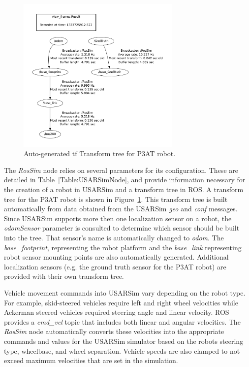 \begin{figure}[t!]
\centering
\includegraphics[width=8cm]{Figures/ROS/P3ATFrames.pdf}
\caption{Auto-generated tf Transform tree for P3AT robot.}
\label{Fig:P3ATTransformTree}
\end{figure}

The {\it RosSim} node relies on several parameters for its configuration. These are detailed in Table~\ref{Table:USARSimNode}, and provide information necessary for the creation of a robot in USARSim and a transform tree in ROS. A transform tree for the P3AT robot is shown in Figure~\ref{Fig:P3ATTransformTree}. This transform tree is built automatically from data obtained from the USARSim {\it geo} and {\it conf} messages. Since USARSim supports more then one localization sensor on a robot, the {\it odomSensor} parameter is consulted to determine which sensor should be built into the tree. That sensor's name is automatically changed to {\it odom}. The {\it base\_footprint}, representing the robot platform and the {\it base\_link} representing robot sensor mounting points are also automatically generated. Additional localization sensors (e.g. the ground truth sensor for the P3AT robot) are provided with their own transform tree.

Vehicle movement commands into USARSim vary depending on the robot type. For example, skid-steered vehicles require left and right wheel velocities while Ackerman steered vehicles required steering angle and linear velocity. ROS provides a {\it cmd\_vel} topic that includes both linear and angular velocities. The {\it RosSim} node automatically converts these velocities into the appropriate commands and values for the USARSim simulator based on the robots steering type, wheelbase, and wheel separation. Vehicle speeds are also clamped to not exceed maximum velocities that are set in the simulation.
